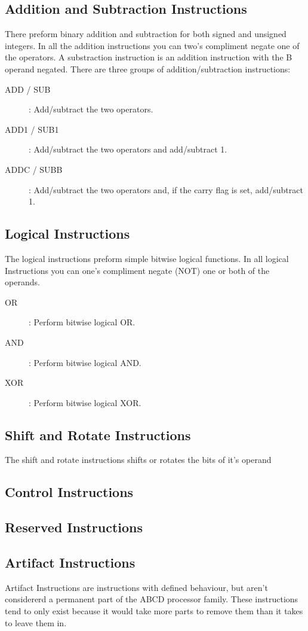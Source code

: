 \documentclass[oneside, a4paper]{memoir}
\begin{document}
\subsection{Addition and Subtraction Instructions}
There preform binary addition and subtraction for both signed and unsigned integers. In all the addition instructions you can two's compliment negate one of the operators. A substraction instruction is an addition instruction with the B operand negated. There are three groups of addition/subtraction instructions:
\begin{description}
\item[ADD / SUB]: Add/subtract the two operators.
\item[ADD1 / SUB1]: Add/subtract the two operators and add/subtract 1.
\item[ADDC / SUBB]: Add/subtract the two operators and, if the carry flag is set, add/subtract 1.
\end{description}
\subsection{Logical Instructions}
The logical instructions preform simple bitwise logical functions. In all logical Instructions you can one's compliment negate (NOT) one or both of the operands.
\begin{description}
\item[OR]: Perform bitwise logical OR.
\item[AND]: Perform bitwise logical AND.
\item[XOR]: Perform bitwise logical XOR.
\end{description}
\subsection{Shift and Rotate Instructions}
The shift and rotate instructions shifts or rotates the bits of it's operand 
\subsection{Control Instructions}
\subsection{Reserved Instructions}
\subsection{Artifact Instructions}
Artifact Instructions are instructions with defined behaviour, but aren't considererd a permanent part of the ABCD processor family. These instructions tend to only exist because it would take more parts to remove them than it takes to leave them in.
\end{document}
